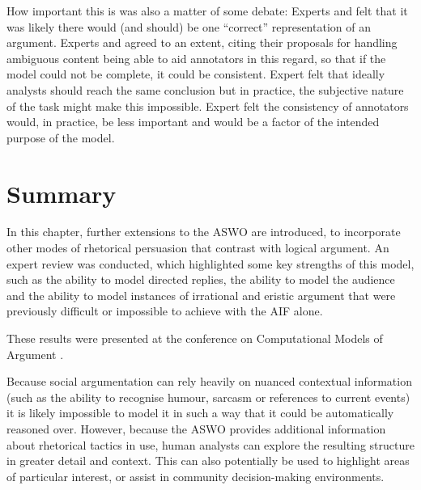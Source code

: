 How important this is was also a matter of some debate: Experts \jodi and \bob felt that it was likely there would (and should) be one ``correct'' representation of an argument. Experts \lizzy and \chris agreed to an extent, citing their proposals for handling ambiguous content being able to aid annotators in this regard, so that if the model could not be complete, it could be consistent. Expert \simon felt that ideally analysts should reach the same conclusion but in practice, the subjective nature of the task might make this impossible. Expert \ash felt the consistency of annotators would, in practice, be less important and would be a factor of the intended purpose of the model.


\section{Summary}   
\label{conclusions}

In this chapter, further extensions to the ASWO are introduced, to incorporate other modes of rhetorical persuasion that contrast with logical argument. An expert review was conducted, which highlighted some key strengths of this model, such as the ability to model directed replies, the ability to model the audience and the ability to model instances of irrational and eristic argument that were previously difficult or impossible to achieve with the AIF alone.

These results were presented at the conference on Computational Models of Argument \citep{Blount2016rhetorical}.

Because social argumentation can rely heavily on nuanced contextual information (such as the ability to recognise humour, sarcasm or references to current events) it is likely impossible to model it in such a way that it could be automatically reasoned over. However, because the ASWO provides additional information about rhetorical tactics in use, human analysts can explore the resulting structure in greater detail and context. This can also potentially be used to highlight areas of particular interest, or assist in community decision-making environments.

%


